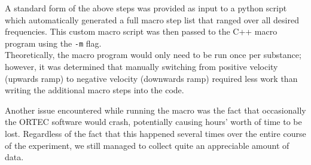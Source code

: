 \documentclass[paper=a4, fontsize=11pt, abstract=on]{scrartcl} %
\numberwithin{equation}{section}
\numberwithin{figure}{section}
\numberwithin{table}{section}
\begin{document}
A standard form of the above steps was provided as input to a python script which automatically generated a full macro step list that ranged over all desired frequencies. This custom macro script was then passed to the C++ macro program using the \texttt{-m} flag. \\

Theoretically, the macro program would only need to be run once per substance; however, it was determined that manually switching from positive velocity (upwards ramp) to negative velocity (downwards ramp) required less work than writing the additional macro steps into the code.

Another issue encountered while running the macro was the fact that occasionally the ORTEC software would crash, potentially causing hours' worth of time to be lost. Regardless of the fact that this happened several times over the entire course of the experiment, we still managed to collect quite an appreciable amount of data.







\end{document}
